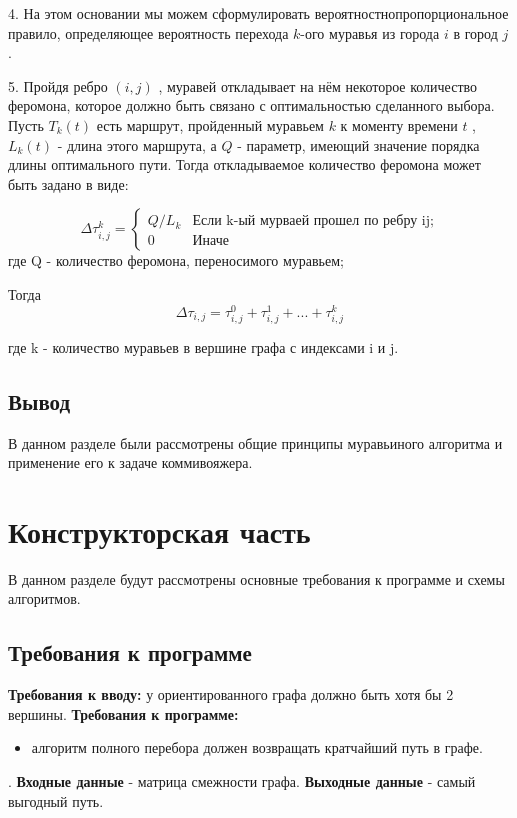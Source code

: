 \documentclass[12pt]{report}
\begin{document}
	 4. На этом основании мы можем сформулировать вероятностнопропорциональное правило, определяющее вероятность перехода $k$-ого муравья из города $i$  в город $j$. 
	 
	5. Пройдя ребро $(i,j)$ , муравей откладывает на нём некоторое количество феромона, которое должно быть связано с оптимальностью сделанного выбора. Пусть $T _{k} (t)$ есть маршрут, пройденный муравьем $k$ к моменту времени $t$ , $L _{k} (t)$ - длина этого маршрута, а $Q$ - параметр, имеющий значение порядка длины оптимального пути. Тогда откладываемое количество феромона может быть задано в виде:
	
 \begin{equation}\label{form:add} 
    {\displaystyle \Delta \tau _{i,j}^k={\begin{cases}Q/L_{k}& {\mbox{Если k-ый мурваей прошел по ребру ij;}}\\0&{\mbox{Иначе}}\end{cases}}}
\end{equation}
   где \quad Q - количество феромона, переносимого муравьем;
   
 Тогда
 \begin{equation}\label{form:add1} 
    \Delta \tau _{i,j}= \tau _{i,j}^0 + \tau _{i,j}^1 + ... + \tau _{i,j}^k 
\end{equation}
   
    где k - количество муравьев в вершине графа с индексами i и j.

	
\section*{Вывод}
В данном разделе были рассмотрены общие принципы муравьиного алгоритма и применение его к задаче коммивояжера. 





\chapter{Конструкторская часть}
В данном разделе будут рассмотрены основные требования к программе и схемы алгоритмов.

\section{Требования к программе}
\textbf{Требования к вводу:}
у ориентированного графа должно быть хотя бы 2 вершины.
\newline
\textbf{Требования к программе:}
\begin{itemize}
\item алгоритм полного перебора должен возвращать кратчайший путь в графе.
\end{itemize}
 .  
\newline  
\textbf{Входные данные} - матрица смежности графа.  
\newline
\textbf{Выходные данные} - самый выгодный путь.
\end{document}
